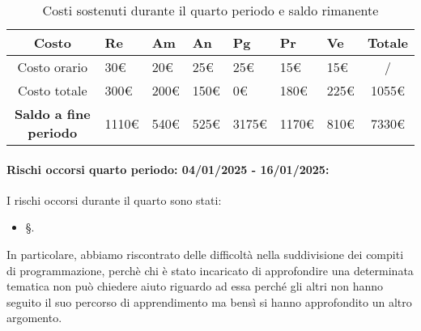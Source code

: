 \begin{table}[!h]
    \centering
    \renewcommand{\arraystretch}{1.5}
    \begin{tabularx}{\textwidth}{|c|X|X|X|X|X|X|c|}\hline
    \rowcolor[HTML]{FFD700} 
    \textbf{Costo} & \textbf{Re} & \textbf{Am} & \textbf{An} & \textbf{Pg} & \textbf{Pr} & \textbf{Ve} & \textbf{Totale} \\ \hline
    Costo orario & 30€ & 20€ & 25€ & 25€ & 15€ & 15€ & /  \\ \hline
    Costo totale & 300€ & 200€ & 150€ & 0€ & 180€ & 225€ & 1055€ \\ \hline
    \rowcolor[HTML]{FFD700} 
    \textbf{Saldo a fine periodo}  & 1110€ & 540€  & 525€ & 3175€ & 1170€ & 810€ & 7330€ \\ \hline
    \end{tabularx}
    \caption{Costi sostenuti durante il quarto periodo e saldo rimanente}
\end{table}

\paragraph{Rischi occorsi quarto periodo: 04/01/2025 - 16/01/2025: }
I rischi occorsi durante il quarto sono stati:
\begin{itemize}
    \item \S{}.
\end{itemize}
In particolare, abbiamo riscontrato delle difficoltà nella suddivisione dei compiti di programmazione, perchè chi è stato incaricato di approfondire una determinata tematica non può chiedere aiuto riguardo ad essa perché gli altri non hanno seguito il suo percorso di apprendimento ma bensì si hanno approfondito un altro argomento.